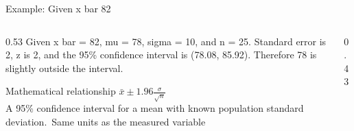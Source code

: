 \documentclass[aspectratio=169]{beamer}
\begin{document}
\begin{frame}{Example: Given x bar 82}
\begin{columns}[T]
\begin{column}{0.53\textwidth}
\small Given x bar = 82, mu = 78, sigma = 10, and n = 25. Standard error is 2, z is 2, and the 95\% confidence interval is (78.08, 85.92). Therefore 78 is slightly outside the interval.

\begin{block}{Mathematical relationship}
\centering\Large $\bar{x}\pm1.96\frac{\sigma}{\sqrt{n}}$\\[0.12cm]
\small A 95\% confidence interval for a mean with known population standard deviation.\ Same units as the measured variable
\end{block}
\end{column}
\begin{column}{0.43\textwidth}
\begin{center}\end{center}
\end{column}
\end{columns}

\end{frame}
\end{document}
